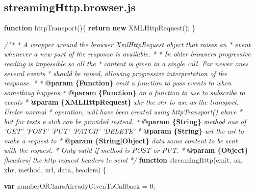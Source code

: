 \documentclass[12pt, ]{article}
\newenvironment{Shaded}{}{}
\newcommand{\KeywordTok}[1]{\textcolor[rgb]{0.00,0.44,0.13}{\textbf{{#1}}}}
\newcommand{\DecValTok}[1]{\textcolor[rgb]{0.25,0.63,0.44}{{#1}}}
\newcommand{\CommentTok}[1]{\textcolor[rgb]{0.38,0.63,0.69}{\textit{{#1}}}}
\newcommand{\FunctionTok}[1]{\textcolor[rgb]{0.02,0.16,0.49}{{#1}}}
\newcommand{\NormalTok}[1]{{#1}}
\begin{document}
\subsection{streamingHttp.browser.js}\label{headerux5fstreamingHttp.browser}

\label{src_streamingHttp.browser}

\begin{Shaded}
\begin{Highlighting}[]
\KeywordTok{function} \FunctionTok{httpTransport}\NormalTok{()\{}
   \KeywordTok{return} \KeywordTok{new} \FunctionTok{XMLHttpRequest}\NormalTok{();}
\NormalTok{\}}

\CommentTok{/**}
\CommentTok{ * A wrapper around the browser XmlHttpRequest object that raises an }
\CommentTok{ * event whenever a new part of the response is available.}
\CommentTok{ * }
\CommentTok{ * In older browsers progressive reading is impossible so all the }
\CommentTok{ * content is given in a single call. For newer ones several events}
\CommentTok{ * should be raised, allowing progressive interpretation of the response.}
\CommentTok{ *      }
\CommentTok{ * }\KeywordTok{@param}\CommentTok{ }\KeywordTok{\{Function\}}\CommentTok{ emit a function to pass events to when something happens}
\CommentTok{ * }\KeywordTok{@param}\CommentTok{ }\KeywordTok{\{Function\}}\CommentTok{ on a function to use to subscribe to events}
\CommentTok{ * }\KeywordTok{@param}\CommentTok{ }\KeywordTok{\{XMLHttpRequest\}}\CommentTok{ xhr the xhr to use as the transport. Under normal}
\CommentTok{ *          operation, will have been created using httpTransport() above}
\CommentTok{ *          but for tests a stub can be provided instead.}
\CommentTok{ * }\KeywordTok{@param}\CommentTok{ }\KeywordTok{\{String\}}\CommentTok{ method one of 'GET' 'POST' 'PUT' 'PATCH' 'DELETE'}
\CommentTok{ * }\KeywordTok{@param}\CommentTok{ }\KeywordTok{\{String\}}\CommentTok{ url the url to make a request to}
\CommentTok{ * }\KeywordTok{@param}\CommentTok{ }\KeywordTok{\{String|Object\}}\CommentTok{ data some content to be sent with the request.}
\CommentTok{ *                        Only valid if method is POST or PUT.}
\CommentTok{ * }\KeywordTok{@param}\CommentTok{ }\KeywordTok{\{Object\}}\CommentTok{ [headers] the http request headers to send                       }
\CommentTok{ */}  
\KeywordTok{function} \FunctionTok{streamingHttp}\NormalTok{(emit, on, xhr, method, url, data, headers) \{}
        
   \KeywordTok{var} \NormalTok{numberOfCharsAlreadyGivenToCallback = }\DecValTok{0}\NormalTok{;}


\end{Highlighting}
\end{Shaded}
\end{document}
